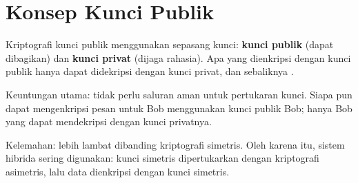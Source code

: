 \section{Konsep Kunci Publik}

Kriptografi kunci publik menggunakan sepasang kunci: \textbf{kunci publik} (dapat dibagikan) dan \textbf{kunci privat} (dijaga rahasia). Apa yang dienkripsi dengan kunci publik hanya dapat didekripsi dengan kunci privat, dan sebaliknya \cite{katz2020,diffie1976}.

Keuntungan utama: tidak perlu saluran aman untuk pertukaran kunci. Siapa pun dapat mengenkripsi pesan untuk Bob menggunakan kunci publik Bob; hanya Bob yang dapat mendekripsi dengan kunci privatnya.

Kelemahan: lebih lambat dibanding kriptografi simetris. Oleh karena itu, sistem hibrida sering digunakan: kunci simetris dipertukarkan dengan kriptografi asimetris, lalu data dienkripsi dengan kunci simetris.
